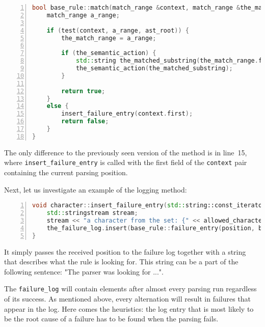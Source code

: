\documentclass[12pt]{article}
\begin{document}
\begin{center}
	\begin{minipage}[ht]{0.9\textwidth}
		\begin{lstlisting}[language=C++, breaklines=true, numbers=left]
bool base_rule::match(match_range &context, match_range &the_match_range, std::shared_ptr<node> &ast_root) {
	match_range a_range;

	if (test(context, a_range, ast_root)) {
		the_match_range = a_range;

		if (the_semantic_action) {
			std::string the_matched_substring(the_match_range.first, the_match_range.second);
			the_semantic_action(the_matched_substring);
		}

		return true;
	}
	else {
		insert_failure_entry(context.first);
		return false;
	}
}
		\end{lstlisting}
	\end{minipage}
\end{center}
The only difference to the previously seen version of the method is in line~15, where
\texttt{insert\_failure\_entry} is called with the first field of the \texttt{context} pair containing the
current parsing position.

Next, let us investigate an example of the logging method:
\begin{center}
	\begin{minipage}[ht]{0.9\textwidth}
		\begin{lstlisting}[language=C++, breaklines=true, numbers=left]
void character::insert_failure_entry(std::string::const_iterator const &position) const {
	std::stringstream stream;
	stream << "a character from the set: {" << allowed_characters << "}";
	the_failure_log.insert(base_rule::failure_entry(position, base_rule::rule_type::terminal_rule, stream.str())); 
}
		\end{lstlisting}
	\end{minipage}
\end{center}
It simply passes the received position to the failure log together with a string that describes what the rule
is looking for. This string can be a part of the following sentence: "The parser was looking for ...".

The \texttt{failure\_log} will contain elements after almost every parsing run regardless of its success. As
mentioned above, every alternation will result in failures that appear in the log. Here comes the heuristics:
the log entry that is most likely to be the root cause of a failure has to be found when the parsing fails.
\end{document}
